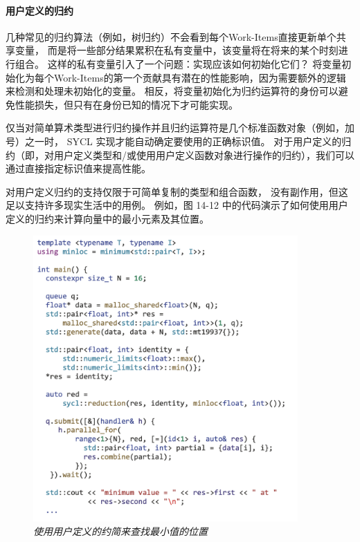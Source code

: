 \paragraph{用户定义的归约}

几种常见的归约算法（例如，树归约）不会看到每个Work-Items直接更新单个共享变量，
而是将一些部分结果累积在私有变量中，该变量将在将来的某个时刻进行组合。 
这样的私有变量引入了一个问题：实现应该如何初始化它们？ 
将变量初始化为每个Work-Items的第一个贡献具有潜在的性能影响，因为需要额外的逻辑来检测和处理未初始化的变量。 
相反，将变量初始化为归约运算符的身份可以避免性能损失，但只有在身份已知的情况下才可能实现。

仅当对简单算术类型进行归约操作并且归约运算符是几个标准函数对象（例如，加号）之一时，
SYCL 实现才能自动确定要使用的正确标识值。 
对于用户定义的归约（即，对用户定义类型和/或使用用户定义函数对象进行操作的归约），我们可以通过直接指定标识值来提高性能。

对用户定义归约的支持仅限于可简单复制的类型和组合函数，
没有副作用，但这足以支持许多现实生活中的用例。 
例如，图 14-12 中的代码演示了如何使用用户定义的归约来计算向量中的最小元素及其位置。

\begin{figure}[H]
	\centering
	\includegraphics[width=0.9\textwidth]{figs/F14.12.png}
	\caption{\textit{使用用户定义的约简来查找最小值的位置 }}
\end{figure}

